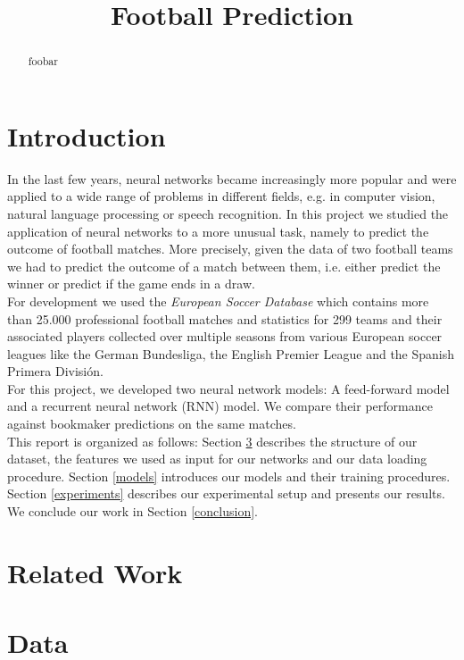 \documentclass[a4paper]{article}
\title{Football Prediction}
\begin{document}
\maketitle
%
\begin{abstract}
foobar
\end{abstract}


%
\section{Introduction}
In the last few years, neural networks became increasingly more popular and were applied to a wide range of problems in different fields, e.g. in computer vision, natural language processing or speech recognition. In this project we studied the application of neural networks to a more unusual task, namely to predict the outcome of football matches. More precisely, given the data of two football teams we had to predict the outcome of a match between them, i.e. either predict the winner or predict if the game ends in a draw. \\
For development we used the \emph{European Soccer Database} \cite{1} which contains more than 25.000 professional football matches and statistics for 299 teams and their associated players collected over multiple seasons from various European soccer leagues like the German Bundesliga, the English Premier League and the Spanish Primera División. \\
For this project, we developed two neural network models: A feed-forward model and a recurrent neural network (RNN) model. We compare their performance against bookmaker predictions on the same matches. \\
This report is organized as follows: Section \ref{data} describes the structure of our dataset, the features we used as input for our networks and our data loading procedure. Section \ref{models} introduces our  models and their training procedures. Section \ref{experiments} describes our experimental setup and presents our results. We conclude our work in Section \ref{conclusion}.


\section{Related Work} \label{relatedwork}


\section{Data} \label{data}
\end{document}
